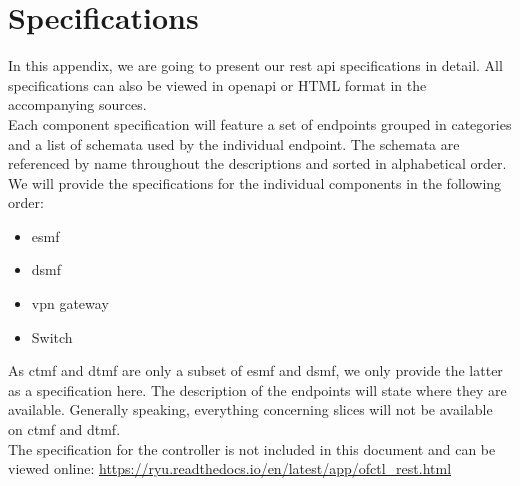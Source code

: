 \chapter{Specifications}
\label{specifications}

In this appendix, we are going to present our \acrshort{rest} \acrshort{api} specifications in detail. All specifications can also be viewed in \Gls{openapi} or HTML format in the accompanying sources.\\

Each component specification will feature a set of endpoints grouped in categories and a list of schemata used by the individual endpoint. The schemata are referenced by name throughout the descriptions and sorted in alphabetical order.\\

We will provide the specifications for the individual components in the following order:

\begin{itemize}
    \item \acrshort{esmf}
    \item \acrshort{dsmf}
    \item \acrshort{vpn} gateway
    \item Switch
\end{itemize}

As \acrshort{ctmf} and \acrshort{dtmf} are only a subset of \acrshort{esmf} and \acrshort{dsmf}, we only provide the latter as a specification here. The description of the endpoints will state where they are available. Generally speaking, everything concerning slices will not be available on \acrshort{ctmf} and \acrshort{dtmf}.\\

The specification for the controller is not included in this document and can be viewed online:
\href{https://ryu.readthedocs.io/en/latest/app/ofctl\_rest.html}{https://ryu.readthedocs.io/en/latest/app/ofctl\_rest.html}

